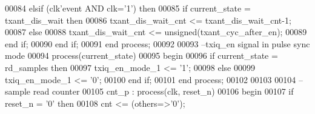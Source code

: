 \begin{DoxyCode}
00084    \textcolor{keywordflow}{elsif} \textcolor{vhdlchar}{(}\textcolor{vhdlchar}{clk}\textcolor{vhdlchar}{'}\textcolor{vhdlkeyword}{event} \textcolor{keywordflow}{AND} \textcolor{vhdlchar}{clk}\textcolor{vhdlchar}{=}\textcolor{vhdlchar}{'}\textcolor{vhdllogic}{}\textcolor{vhdllogic}{1}\textcolor{vhdlchar}{'}\textcolor{vhdlchar}{)} \textcolor{keywordflow}{then}
00085       \textcolor{keywordflow}{if} \textcolor{vhdlchar}{current_state} \textcolor{vhdlchar}{=} \textcolor{vhdlchar}{txant\_dis\_wait} \textcolor{keywordflow}{then} 
00086          \textcolor{vhdlchar}{txant_dis_wait_cnt} \textcolor{vhdlchar}{<=} \textcolor{vhdlchar}{txant_dis_wait_cnt}\textcolor{vhdlchar}{-}\textcolor{vhdllogic}{}\textcolor{vhdllogic}{1};
00087       \textcolor{keywordflow}{else} 
00088          \textcolor{vhdlchar}{txant_dis_wait_cnt} \textcolor{vhdlchar}{<=} \textcolor{comment}{unsigned}\textcolor{vhdlchar}{(}\textcolor{vhdlchar}{txant_cyc_after_en}\textcolor{vhdlchar}{)};
00089       \textcolor{keywordflow}{end} \textcolor{keywordflow}{if};
00090    \textcolor{keywordflow}{end} \textcolor{keywordflow}{if};
00091 \textcolor{keywordflow}{end} \textcolor{keywordflow}{process};
00092 
00093 \textcolor{keyword}{--txiq\_en signal in pulse sync mode}
00094 \textcolor{keywordflow}{process}(current_state)
00095 \textcolor{vhdlkeyword}{begin }
00096    \textcolor{keywordflow}{if} \textcolor{vhdlchar}{current_state} \textcolor{vhdlchar}{=} \textcolor{vhdlchar}{rd\_samples} \textcolor{keywordflow}{then} 
00097       \textcolor{vhdlchar}{txiq_en_mode_1} \textcolor{vhdlchar}{<=} \textcolor{vhdlchar}{'}\textcolor{vhdllogic}{}\textcolor{vhdllogic}{1}\textcolor{vhdlchar}{'};
00098    \textcolor{keywordflow}{else} 
00099       \textcolor{vhdlchar}{txiq_en_mode_1} \textcolor{vhdlchar}{<=} \textcolor{vhdlchar}{'}\textcolor{vhdllogic}{}\textcolor{vhdllogic}{0}\textcolor{vhdlchar}{'};
00100    \textcolor{keywordflow}{end} \textcolor{keywordflow}{if};
00101 \textcolor{keywordflow}{end} \textcolor{keywordflow}{process};
00102 
00103 
00104 \textcolor{keyword}{--sample read counter}
00105 cnt\_p : \textcolor{keywordflow}{process}(clk, reset_n)
00106 \textcolor{vhdlkeyword}{begin}
00107    \textcolor{keywordflow}{if} \textcolor{vhdlchar}{reset_n} \textcolor{vhdlchar}{=} \textcolor{vhdlchar}{'}\textcolor{vhdllogic}{}\textcolor{vhdllogic}{0}\textcolor{vhdlchar}{'} \textcolor{keywordflow}{then} 
00108       \textcolor{vhdlchar}{cnt} \textcolor{vhdlchar}{<=} \textcolor{vhdlchar}{(}\textcolor{keywordflow}{others}\textcolor{vhdlchar}{=}\textcolor{vhdlchar}{>}\textcolor{vhdlchar}{'}\textcolor{vhdllogic}{}\textcolor{vhdllogic}{0}\textcolor{vhdlchar}{'}\textcolor{vhdlchar}{)};

\end{DoxyCode}
